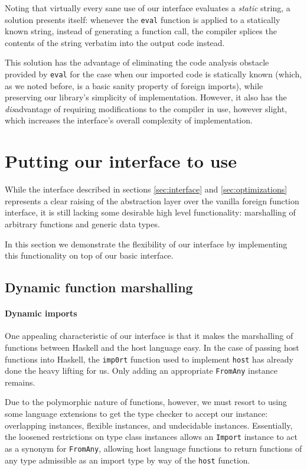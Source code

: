 \documentclass{sigplanconf}
\begin{document}
Noting that virtually every sane use of our interface evaluates a \emph{static}
string, a solution presents itself: whenever the \lstinline!eval! function
is applied to a statically known string, instead of generating a function call,
the compiler splices the contents of the string verbatim into the output code
instead.

This solution has the advantage of eliminating the code analysis obstacle
provided by \lstinline!eval! for the case when our imported code is statically
known (which, as we noted before, is a basic sanity property of foreign
imports), while preserving our library's simplicity of implementation.
However, it also has the \emph{dis}advantage of requiring modifications to the
compiler in use, however slight, which increases the interface's overall
complexity of implementation.

\section{Putting our interface to use}
\label{sec:extensions}
While the interface described in sections \ref{sec:interface} and
\ref{sec:optimizations} represents a clear raising of the abstraction layer
over the vanilla foreign function interface, it is still lacking some
desirable high level functionality: marshalling of arbitrary functions and
generic data types.

In this section we demonstrate the flexibility of our interface by implementing
this functionality on top of our basic interface.

\subsection{Dynamic function marshalling}
\label{sec:marshalling-functions}
\paragraph{Dynamic imports}
One appealing characteristic of our interface is that it makes the marshalling
of functions between Haskell and the host language easy. In the case of
passing host functions into Haskell, the \lstinline!imp0rt! function used to
implement \lstinline!host! has already done the heavy lifting for us.
Only adding an appropriate \lstinline!FromAny! instance remains.

Due to the polymorphic nature of functions, however, we must resort to using
some language extensions to get the type checker to accept our instance:
overlapping instances, flexible instances, and undecidable instances.
Essentially, the loosened restrictions on type class instances allows an
\lstinline!Import! instance to act as a synonym for \lstinline!FromAny!,
allowing host language functions to return functions of any type admissible
as an import type by way of the \lstinline!host! function.
\end{document}
